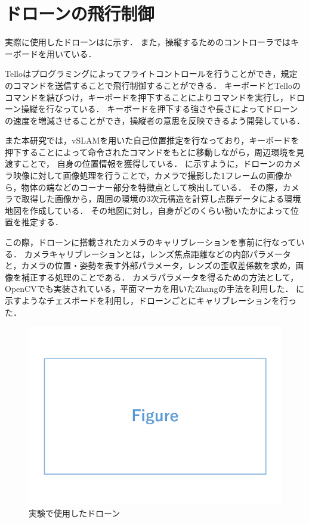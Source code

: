 \documentclass[a4paper,11pt]{ujreport}
\begin{document}
\section{ドローンの飛行制御}
\label{sec:ControlDrone}

実際に使用したドローンはに示す．
また，操縦するためのコントローラではキーボードを用いている．

Telloはプログラミングによってフライトコントロールを行うことができ，規定のコマンドを送信することで飛行制御することができる．
キーボードとTelloのコマンドを結びつけ，キーボードを押下することによりコマンドを実行し，ドローン操縦を行なっている．
キーボードを押下する強さや長さによってドローンの速度を増減させることができ，操縦者の意思を反映できるよう開発している．

また本研究では，vSLAMを用いた自己位置推定を行なっており，キーボードを押下することによって命令されたコマンドをもとに移動しながら，周辺環境を見渡すことで，
自身の位置情報を獲得している．
に示すように，ドローンのカメラ映像に対して画像処理を行うことで，カメラで撮影した1フレームの画像から，物体の端などのコーナー部分を特徴点として検出している．
その際，カメラで取得した画像から，周囲の環境の3次元構造を計算し点群データによる環境地図を作成している．
その地図に対し，自身がどのくらい動いたかによって位置を推定する．

この際，ドローンに搭載されたカメラのキャリブレーションを事前に行なっている．
カメラキャリブレーションとは，レンズ焦点距離などの内部パラメータと，カメラの位置・姿勢を表す外部パラメータ，レンズの歪収差係数を求め，画像を補正する処理のことである．
カメラパラメータを得るための方法として，OpenCV\cite{article-opencv}でも実装されている，平面マーカを用いたZhangの手法\cite{article-zhang}を利用した．
に示すようなチェスボードを利用し，ドローンごとにキャリブレーションを行った．



\begin{figure}[!tb]
  \centering
  \includegraphics[width=0.7\linewidth]{img/sample.pdf}
  \caption{実験で使用したドローン}
  \label{fig:04_drone}
\end{figure}
\end{document}

